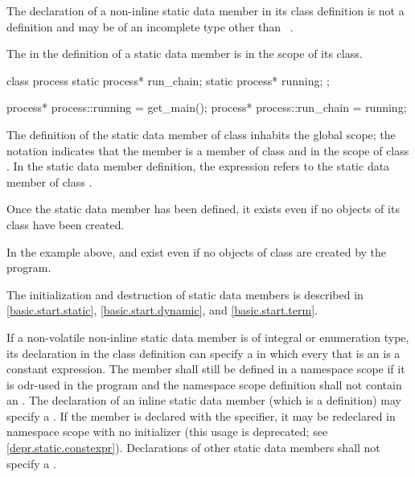 \pnum
{}%
%
The declaration of a non-inline
static data member in its class definition
is not a definition and may be of an incomplete type other than
\cv{}~.
%
\begin{note}
The  in the definition of a
static data member is in the scope of its
class.
\end{note}
\begin{example}
\begin{codeblock}
class process {
  static process* run_chain;
  static process* running;
};

process* process::running = get_main();
process* process::run_chain = running;
\end{codeblock}

The definition of the static data member  of class
 inhabits the global scope; the notation
 indicates that the member 
is a member of class  and in the scope of class
. In the static data member definition, the
 expression refers to the static data
member  of class .
\end{example}

\begin{note}
Once the static data member has been defined, it exists even if
no objects of its class have been created.
\begin{example}
In the example above,  and  exist even
if no objects of class  are created by the program.
\end{example}
The initialization and destruction of static data members is described in
\ref{basic.start.static}, \ref{basic.start.dynamic}, and \ref{basic.start.term}.
\end{note}

\pnum
If a non-volatile non-inline  static data member is
of integral or enumeration type,
its declaration in the class definition can specify a
 in which every
 that is an 
is a constant expression.
The member shall still be defined in a namespace scope if
it is odr-used in the program and the
namespace scope definition shall not contain an .
The declaration of an inline static data member (which is a definition)
may specify a . If the
member is declared with the  specifier, it may be
redeclared in namespace scope with no initializer (this usage is
deprecated; see \ref{depr.static.constexpr}). Declarations of other
static data members shall not specify a .

